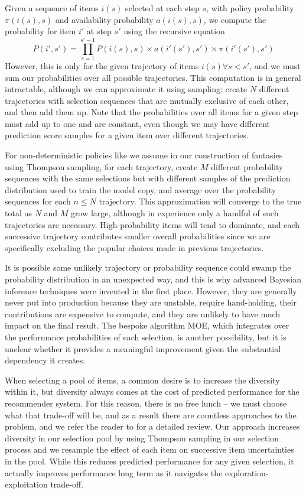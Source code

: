 \documentclass{article}
\begin{document}
Given a sequence of items $i(s)$ selected at each step $s$, with policy probability $\pi(i(s), s)$ and availability probability $a(i(s), s)$, we compute the probability for item $i'$ at step $s'$ using the recursive equation \begin{equation}
P(i',s')=\prod_{s=1}^{s'-1} P(i(s),s)\times a(i'(s'),s')\times \pi(i'(s'),s')
\end{equation}However, this is only for the given trajectory of items $i(s)\forall s<s'$, and we must sum our probabilities over all possible trajectories. This computation is in general intractable, although we can approximate it using sampling: create $N$ different trajectories with selection sequences that are mutually exclusive of each other, and then add them up. Note that the probabilities over all items for a given step must add up to one and are constant, even though we may have different prediction score samples for a given item over different trajectories. 

For non-deterministic policies like we assume in our construction of fantasies using Thompson sampling, for each trajectory, create $M$ different probability sequences with the same selections but with different samples of the prediction distribution used to train the model copy, and average over the probability sequences for each $n\leq N$ trajectory. This approximation will converge to the true total as $N$ and $M$ grow large, although in experience only a handful of such trajectories are necessary. High-probability items will tend to dominate, and each successive trajectory contributes smaller overall probabilities since we are specifically excluding the popular choices made in previous trajectories.

It is possible some unlikely trajectory or probability sequence could swamp the probability distribution in an unexpected way, and this is why advanced Bayesian inference techniques were invented in the first place. However, they are generally never put into production because they are unstable, require hand-holding, their contributions are expensive to compute, and they are unlikely to have much impact on the final result. The bespoke algorithm MOE, which integrates over the performance probabilities of each selection\cite{scott_clark}, is another possibility, but it is unclear whether it provides a meaningful improvement given the substantial dependency it creates.

When selecting a pool of items, a common desire is to increase the diversity within it, but diversity always comes at the cost of predicted performance for the recommender system. For this reason, there is no free lunch -- we must choose what that trade-off will be, and as a result there are countless approaches to the problem, and we refer the reader to \cite{recsys_diversity_survey, netflix_recommender_system} for a detailed review.  
Our approach increases diversity in our selection pool by using Thompson sampling in our selection process and we resample the effect of each item on successive item uncertainties in the pool. While this reduces predicted performance for any given selection, it actually improves performance long term as it navigates the exploration-exploitation trade-off.
\end{document}
